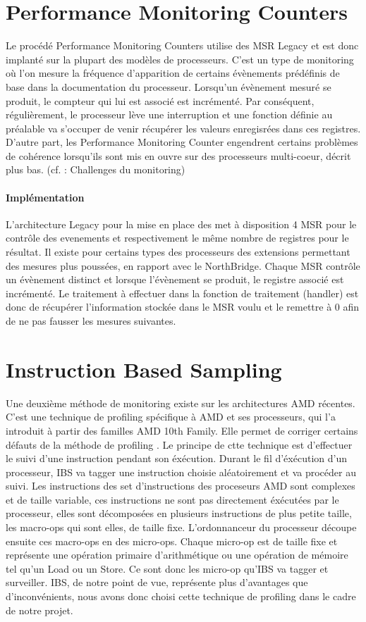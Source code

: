 	\section{Performance Monitoring Counters}
		Le procédé Performance Monitoring Counters utilise des MSR Legacy et est donc implanté sur la plupart des modèles de processeurs. C'est un type de monitoring où l'on mesure la fréquence d'apparition de certains évènements prédéfinis de base dans la documentation du processeur. Lorsqu'un évènement mesuré se produit, le compteur qui lui est associé est incrémenté. Par conséquent, régulièrement, le processeur lève une interruption et une fonction définie au préalable va s'occuper de venir récupérer les valeurs enregisrées dans ces registres. D'autre part, les Performance Monitoring Counter engendrent certains problèmes de cohérence lorsqu'ils sont mis en ouvre sur des processeurs multi-coeur, décrit plus bas. (cf. : Challenges du monitoring)
		\paragraph{Implémentation}
			L'architecture Legacy pour la mise en place des \PMC met à disposition 4 MSR pour le contrôle des evenements et respectivement le même nombre de registres pour le résultat. Il existe pour certains types des processeurs des extensions permettant des mesures plus poussées, en rapport avec le NorthBridge. Chaque MSR contrôle un évènement distinct et lorsque l'évènement se produit, le registre associé est incrémenté. Le traitement à effectuer dans la fonction de traitement (handler) est donc de récupérer l'information stockée dans le MSR voulu et le remettre à 0 afin de ne pas fausser les mesures suivantes.
	\section{Instruction Based Sampling}
		Une deuxième méthode de monitoring existe sur les architectures AMD récentes. C'est une technique de profiling spécifique à AMD et ses processeurs, qui l'a introduit à partir des familles AMD 10th Family. Elle permet de corriger certains défauts de la méthode de profiling \PMC. Le principe de ctte technique est d'effectuer le suivi d'une instruction pendant son éxécution. Durant le fil d'éxécution d'un processeur, IBS va tagger une instruction choisie aléatoirement et va procéder au suivi. Les instructions des set d'instructions des proceseurs AMD sont complexes et de taille variable, ces instructions ne sont pas directement éxécutées par le processeur, elles sont décomposées en plusieurs instructions de plus petite taille, les macro-ops qui sont elles, de taille fixe. L'ordonnanceur du processeur découpe ensuite ces macro-ops en des micro-ops. Chaque micro-op est de taille fixe et représente une opération primaire d'arithmétique ou une opération de mémoire tel qu'un Load ou un Store. Ce sont donc les micro-op qu'IBS va tagger et surveiller. IBS, de notre point de vue, représente plus d'avantages que d'inconvénients, nous avons donc choisi cette technique de profiling dans le cadre de notre projet.
